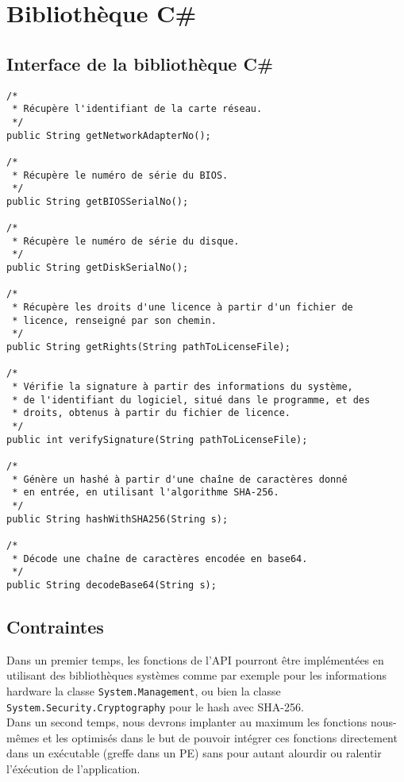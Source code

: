 \documentclass{article}
\begin{document}
\section{Bibliothèque C\#}
\subsection{Interface de la bibliothèque C\#}
\begin{verbatim}
/*
 * Récupère l'identifiant de la carte réseau.
 */
public String getNetworkAdapterNo();

/*
 * Récupère le numéro de série du BIOS.
 */
public String getBIOSSerialNo();

/*
 * Récupère le numéro de série du disque.
 */
public String getDiskSerialNo();

/*
 * Récupère les droits d'une licence à partir d'un fichier de
 * licence, renseigné par son chemin.
 */
public String getRights(String pathToLicenseFile);

/*
 * Vérifie la signature à partir des informations du système,
 * de l'identifiant du logiciel, situé dans le programme, et des
 * droits, obtenus à partir du fichier de licence.
 */
public int verifySignature(String pathToLicenseFile);

/*
 * Génère un hashé à partir d'une chaîne de caractères donné
 * en entrée, en utilisant l'algorithme SHA-256.
 */
public String hashWithSHA256(String s);

/*
 * Décode une chaîne de caractères encodée en base64.
 */
public String decodeBase64(String s);
\end{verbatim}

\subsection{Contraintes}
Dans un premier temps, les fonctions de l'API pourront être implémentées en utilisant des bibliothèques systèmes
comme par exemple pour les informations hardware la classe \verb:System.Management:, ou bien la classe
\verb:System.Security.Cryptography: pour le hash avec SHA-256.\\

Dans un second temps, nous devrons implanter au maximum les fonctions nous-mêmes et les optimisés dans le but
de pouvoir intégrer ces fonctions directement dans un exécutable (greffe dans un PE) sans pour autant alourdir
ou ralentir l'éxécution de l'application.
\end{document}
